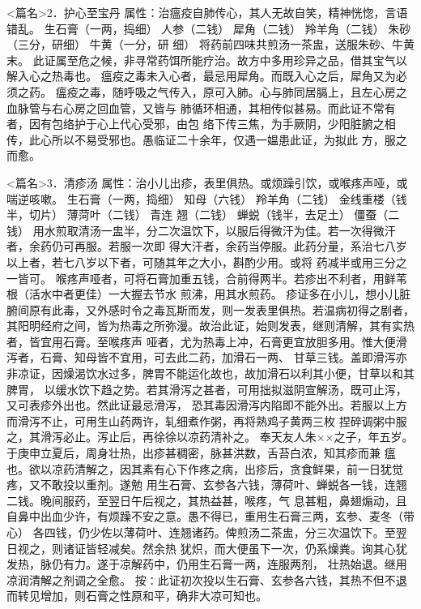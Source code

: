 \documentclass[a4paper,12pt,UTF8,twoside]{ctexbook}
\begin{document}
<篇名>2．护心至宝丹
属性：治瘟疫自肺传心，其人无故自笑，精神恍惚，言语错乱。 
生石膏（一两，捣细） 人参（二钱） 犀角（二钱） 羚羊角（二钱） 朱砂（三分，研细） 牛黄（一分，研 
细） 
将药前四味共煎汤一茶盅，送服朱砂、牛黄末。 
此证属至危之候，非寻常药饵所能疗治。故方中多用珍异之品，借其宝气以解入心之热毒也。 
瘟疫之毒未入心者，最忌用犀角。而既入心之后，犀角又为必须之药。 
瘟疫之毒，随呼吸之气传入，原可入肺。心与肺同居膈上，且左心房之血脉管与右心房之回血管，又皆与 
肺循环相通，其相传似甚易。而此证不常有者，因有包络护于心上代心受邪，由包 
络下传三焦，为手厥阴，少阳脏腑之相传，此心所以不易受邪也。愚临证二十余年，仅遇一媪患此证，为拟此 
方，服之而愈。 


<篇名>3．清疹汤
属性：治小儿出疹，表里俱热。或烦躁引饮，或喉疼声哑，或喘逆咳嗽。 
生石膏（一两，捣细） 知母（六钱） 羚羊角（二钱） 金线重楼（钱半，切片） 薄菏叶（二钱） 青连 
翘（二钱） 蝉蜕（钱半，去足土） 僵蚕（二钱） 
用水煎取清汤一盅半，分二次温饮下，以服后得微汗为佳。若一次得微汗者，余药仍可再服。若服一次即 
得大汗者，余药当停服。此药分量，系治七八岁以上者，若七八岁以下者，可随其年之大小，斟酌少用。或将 
药减半或用三分之一皆可。 
喉疼声哑者，可将石膏加重五钱，合前得两半。若疹出不利者，用鲜苇根（活水中者更佳）一大握去节水 
煎沸，用其水煎药。 
疹证多在小儿，想小儿脏腑间原有此毒，又外感时令之毒瓦斯而发，则一发表里俱热。若温病初得之剧者， 
其阳明经府之间，皆为热毒之所弥漫。故治此证，始则发表，继则清解，其有实热者，皆宜用石膏。至喉疼声 
哑者，尤为热毒上冲，石膏更宜放胆多用。惟大便滑泻者，石膏、知母皆不宜用，可去此二药，加滑石一两、 
甘草三钱。盖即滑泻亦非凉证，因燥渴饮水过多，脾胃不能运化故也，故加滑石以利其小便，甘草以和其脾胃， 
以缓水饮下趋之势。若其滑泻之甚者，可用拙拟滋阴宣解汤，既可止泻，又可表疹外出也。然此证最忌滑泻， 
恐其毒因滑泻内陷即不能外出。若服以上方而滑泻不止，可用生山药两许，轧细煮作粥，再将熟鸡子黄两三枚 
捏碎调粥中服之，其滑泻必止。泻止后，再徐徐以凉药清补之。 
奉天友人朱××之子，年五岁。于庚申立夏后，周身壮热，出疹甚稠密，脉甚洪数，舌苔白浓，知其疹而兼 
瘟也。欲以凉药清解之，因其素有心下作疼之病，出疹后，贪食鲜果，前一日犹觉疼，又不敢投以重剂。遂勉 
用生石膏、玄参各六钱，薄荷叶、蝉蜕各一钱，连翘二钱。晚间服药，至翌日午后视之，其热益甚，喉疼，气 
息甚粗，鼻翅煽动，且自鼻中出血少许，有烦躁不安之意。愚不得已，重用生石膏三两，玄参、麦冬（带心） 
各四钱，仍少佐以薄荷叶、连翘诸药。俾煎汤二茶盅，分三次温饮下。至翌日视之，则诸证皆轻减矣。然余热 
犹炽，而大便虽下一次，仍系燥粪。询其心犹发热，脉仍有力。遂于凉解药中，仍用生石膏一两，连服两剂， 
壮热始退。继用凉润清解之剂调之全愈。 
按∶此证初次投以生石膏、玄参各六钱，其热不但不退而转见增加，则石膏之性原和平，确非大凉可知也。 
\end{document}
